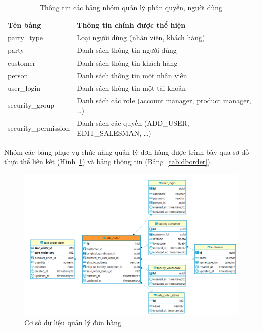 \begin{table}[H]
\centering
\begin{tabular}{| m{5cm} | m{10cm} |}
\hline
\textbf{Tên bảng} & \textbf{Thông tin chính được thể hiện} \\
\hline
party\_type & Loại người dùng (nhân viên, khách hàng) \\
\hline
party & Danh sách thông tin người dùng \\
\hline
customer & Danh sách thông tin khách hàng \\
\hline 
person & Danh sách thông tin một nhân viên \\
\hline 
user\_login & Danh sách thông tin một tài khoản \\
\hline 
security\_group &
Danh sách các role (account manager, product manager, …) \\
\hline
security\_permission &
Danh sách các quyền (ADD\_USER, EDIT\_SALESMAN, …) \\
\hline
\end{tabular}
\caption{Thông tin các bảng nhóm quản lý phân quyền, người dùng}
\label{tab:dbsecurity}
\end{table}

Nhóm các bảng phục vụ chức năng quản lý đơn hàng được
trình bày qua sơ đồ thực thể liên kết (Hình~\ref{fig:dborder})
và bảng thông tin (Bảng~\ref{tab:dborder}).
\begin{figure}[H]
\centering
\includegraphics[width=17cm]{images/database/order.png}
\caption{Cơ sở dữ liệu quản lý đơn hàng}
\label{fig:dborder}
\end{figure}

